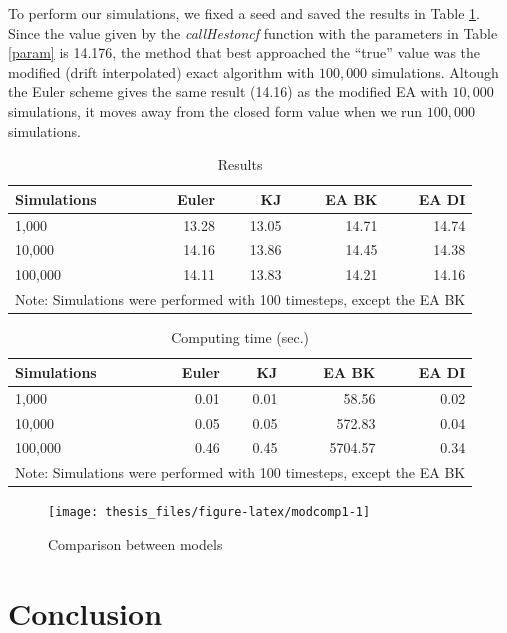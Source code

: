 \documentclass[12pt,twoside]{reedthesis}
\theoremstyle{definition}
\theoremstyle{definition}
\theoremstyle{remark}
\begin{document}
  To perform our simulations, we fixed a seed and saved the results in
  Table \ref{res}. Since the value given by the \emph{callHestoncf}
  function with the parameters in Table \ref{param} is 14.176, the method
  that best approached the ``true'' value was the modified (drift
  interpolated) exact algorithm with \(100,000\) simulations. Altough the
  Euler scheme gives the same result (14.16) as the modified EA with
  \(10,000\) simulations, it moves away from the closed form value when we
  run \(100,000\) simulations.
  \begin{table}[ht]
  \centering
  \begin{tabular}{lrrrr}
    \hline 
  Simulations & Euler & KJ & EA BK & EA DI \\ 
    \hline 
  1,000 & 13.28 & 13.05 & 14.71 & 14.74 \\ 
    10,000 & 14.16 & 13.86 & 14.45 & 14.38 \\ 
    100,000 & 14.11 & 13.83 & 14.21 & 14.16 \\ 
     \hline 
  \multicolumn{5}{l}{\scriptsize{Note: Simulations were performed with 100 timesteps, except the EA BK}} 
  \end{tabular}
  \caption{Results} 
  \label{res}
  \end{table}
  \begin{table}[ht]
  \centering
  \begin{tabular}{lrrrr}
    \hline 
  Simulations & Euler & KJ & EA BK & EA DI \\ 
    \hline 
  1,000 & 0.01 & 0.01 & 58.56 & 0.02 \\ 
    10,000 & 0.05 & 0.05 & 572.83 & 0.04 \\ 
    100,000 & 0.46 & 0.45 & 5704.57 & 0.34 \\ 
     \hline 
  \multicolumn{5}{l}{\scriptsize{Note: Simulations were performed with 100 timesteps, except the EA BK}} 
  \end{tabular}
  \caption{Computing time (sec.)} 
  \label{timming}
  \end{table}
  \begin{figure}
  
  {\centering \texttt{[image: thesis\_files/figure-latex/modcomp1-1]} 
  
  }
  
  \caption{Comparison between models \label{modcomp1}}\label{fig:modcomp1}
  \end{figure}
  \chapter*{Conclusion}\label{conclusion}
  
\end{document}
